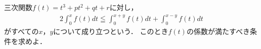 \documentclass[../../main.tex]{subfiles}
\begin{document}
三次関数$f(t)=t^3+pt^2+qt+r$に対し，
\begin{align}
  2\int_0^xf(t)dt\leqq\int_0^{x+y}f(t)dt+\int_0^{x-y}f(t)dt
\end{align}
がすべての$x$，$y$について成り立つという．
このとき$f(t)$の係数が満たすべき条件を求めよ．
\end{document}

